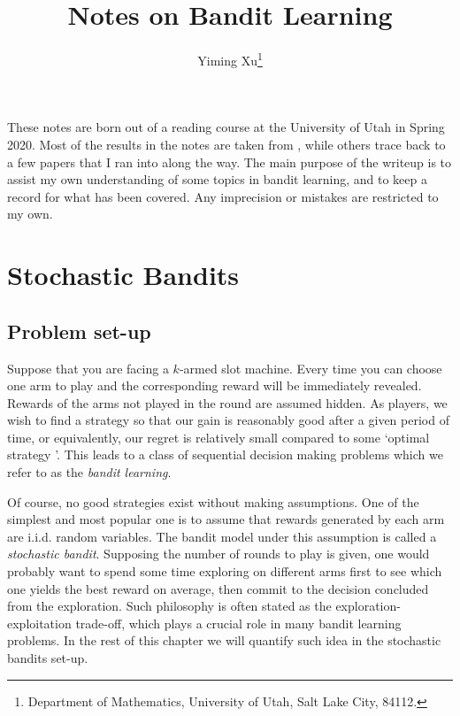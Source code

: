 \documentclass[10pt, openright]{book}
\numberwithin{equation}{section}
\theoremstyle{plain}
\theoremstyle{definition}
\begin{document}
\title{Notes on Bandit Learning}
\date{}
\author{Yiming Xu\thanks{Department of Mathematics, University of Utah, Salt Lake City, 84112. }}
\maketitle

\vspace*{\fill}
These notes are born out of a reading course at the University of Utah in Spring 2020. Most of the results in the notes are taken from \cite{lattimore2018bandit}, while others trace back to a few papers that I ran into along the way. The main purpose of the writeup is to assist my own understanding of some topics in bandit learning, and to keep a record for what has been covered. Any imprecision or mistakes are restricted to my own. 
\vspace*{\fill}

\bigskip

\bigskip

\bigskip

\tableofcontents
\newpage

\chapter{Stochastic Bandits}\label{sec1}

\section{Problem set-up}\label{bg}

Suppose that you are facing a $k$-armed slot machine. Every time you can choose one arm to play and the corresponding reward will be immediately revealed. Rewards of the arms not played in the round are assumed hidden. As players, we wish to find a strategy so that our gain is reasonably good after a given period of time, or equivalently, our regret is relatively small compared to some `optimal strategy '. This leads to a class of sequential decision making problems which we refer to as the \emph{bandit learning}.  

Of course, no good strategies exist without making assumptions. One of the simplest and most popular one is to assume that rewards generated by each arm are i.i.d. random variables. The bandit model under this assumption is called a \emph{stochastic bandit}. Supposing the number of rounds to play is given, one would probably want to spend some time exploring on different arms first to see which one yields the best reward on average, then commit to the decision concluded from the exploration. Such philosophy is often stated as the exploration-exploitation trade-off, which plays a crucial role in many bandit learning problems. In the rest of this chapter we will quantify such idea in the stochastic bandits set-up. 
\end{document}
